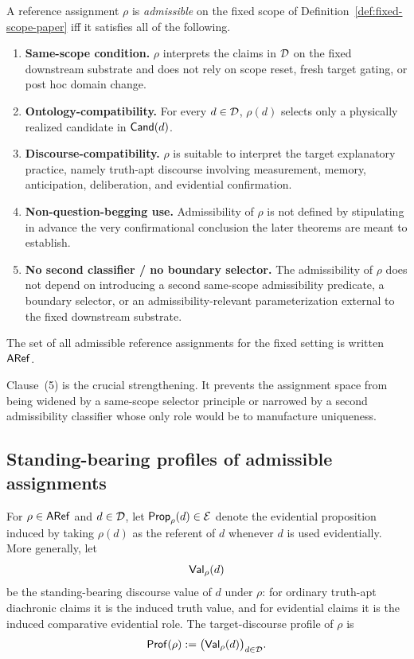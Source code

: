 \begin{definition}
\label{def:admissible-reference-assignment}
A reference assignment $\rho$ is \emph{admissible} on the fixed scope of
Definition~\ref{def:fixed-scope-paper} iff it satisfies all of the following.
\begin{enumerate}
    \item \textbf{Same-scope condition.} $\rho$ interprets the claims in $\mathcal{D}$ on the fixed downstream
    substrate and does not rely on scope reset, fresh target gating, or post hoc domain change.
    \item \textbf{Ontology-compatibility.} For every $d\in\mathcal{D}$, $\rho(d)$ selects only a physically
    realized candidate in $\mathsf{Cand}(d)$.
    \item \textbf{Discourse-compatibility.} $\rho$ is suitable to interpret the target explanatory practice,
    namely truth-apt discourse involving measurement, memory, anticipation, deliberation, and
    evidential confirmation.
    \item \textbf{Non-question-begging use.} Admissibility of $\rho$ is not defined by stipulating in
    advance the very confirmational conclusion the later theorems are meant to establish.
    \item \textbf{No second classifier / no boundary selector.} The admissibility of $\rho$ does not
    depend on introducing a second same-scope admissibility predicate, a boundary selector, or an
    admissibility-relevant parameterization external to the fixed downstream substrate.
\end{enumerate}
The set of all admissible reference assignments for the fixed setting is written $\mathsf{ARef}$.
\end{definition}

Clause~(5) is the crucial strengthening. It prevents the assignment space from being widened by a
same-scope selector principle or narrowed by a second admissibility classifier whose only role would
be to manufacture uniqueness.

\subsection{Standing-bearing profiles of admissible assignments}

For $\rho\in\mathsf{ARef}$ and $d\in\mathcal{D}$, let $\mathsf{Prop}_\rho(d)\in\mathcal{E}$ denote the evidential proposition
induced by taking $\rho(d)$ as the referent of $d$ whenever $d$ is used evidentially. More generally,
let
\[
\mathsf{Val}_\rho(d)
\]
be the standing-bearing discourse value of $d$ under $\rho$: for ordinary truth-apt diachronic claims
it is the induced truth value, and for evidential claims it is the induced comparative evidential role.
The target-discourse profile of $\rho$ is
\[
\mathsf{Prof}(\rho):=\bigl(\mathsf{Val}_\rho(d)\bigr)_{d\in\mathcal{D}}.
\]


